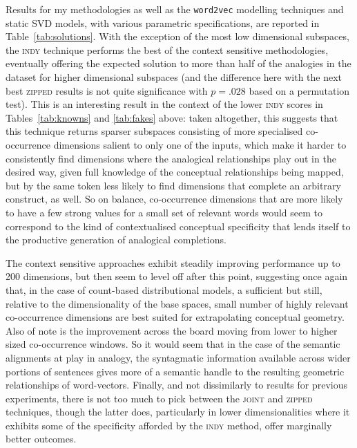 Results for my methodologies as well as the \texttt{word2vec} modelling techniques and static SVD models, with various parametric specifications, are reported in Table~\ref{tab:solutions}.  With the exception of the most low dimensional subspaces, the \textsc{indy} technique performs the best of the context sensitive methodologies, eventually offering the expected solution to more than half of the analogies in the dataset for higher dimensional subspaces (and the difference here with the next best \textsc{zipped} results is not quite significance with $p = .028$ based on a permutation test).  This is an interesting result in the context of the lower \textsc{indy} scores in Tables~\ref{tab:knowns} and \ref{tab:fakes} above: taken altogether, this suggests that this technique returns sparser subspaces consisting of more specialised co-occurrence dimensions salient to only one of the inputs, which make it harder to consistently find dimensions where the analogical relationships play out in the desired way, given full knowledge of the conceptual relationships being mapped, but by the same token less likely to find dimensions that complete an arbitrary construct, as well.  So on balance, co-occurrence dimensions that are more likely to have a few strong values for a small set of relevant words would seem to correspond to the kind of contextualised conceptual specificity that lends itself to the productive generation of analogical completions.

The context sensitive approaches exhibit steadily improving performance up to 200 dimensions, but then seem to level off after this point, suggesting once again that, in the case of count-based distributional models, a sufficient but still, relative to the dimensionality of the base spaces, small number of highly relevant co-occurrence dimensions are best suited for extrapolating conceptual geometry.  Also of note is the improvement across the board moving from lower to higher sized co-occurrence windows.  So it would seem that in the case of the semantic alignments at play in analogy, the syntagmatic information available across wider portions of sentences gives more of a semantic handle to the resulting geometric relationships of word-vectors.  Finally, and not dissimilarly to results for previous experiments, there is not too much to pick between the \textsc{joint} and \textsc{zipped} techniques, though the latter does, particularly in lower dimensionalities where it exhibits some of the specificity afforded by the \textsc{indy} method, offer marginally better outcomes.

